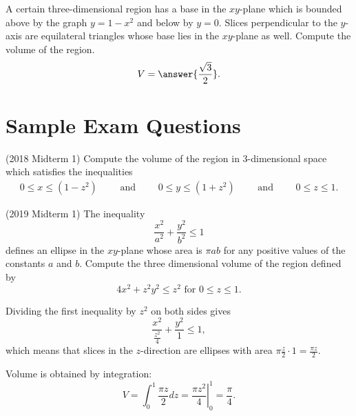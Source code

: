 \documentclass{ximera}
\begin{document}
\begin{exercise}
A certain three-dimensional region has a base in the $xy$-plane which is bounded above by the graph $y = 1-x^2$ and below by $y=0$. Slices perpendicular to the $y$-axis are equilateral triangles whose base lies in the $xy$-plane as well. Compute the volume of the region.
\[ V = \answer{\frac{\sqrt{3}}{2}}. \]
\end{exercise}

\section*{Sample Exam Questions}

\begin{question}(2018 Midterm 1)
Compute the volume of the region in 3-dimensional space which satisfies the inequalities
\begin{align*} 
0 \leq   x \leq (1 - z^2) \qquad \mbox{ and } \qquad
0 \leq  y \leq (1 + z^2) \qquad \mbox{ and } \qquad 
0 \leq z \leq 1.
\end{align*}
\vspace{-12pt}
\begin{multipleChoice}
\end{multipleChoice}
\end{question}

\begin{question}(2019 Midterm 1)
The inequality 
\[ \frac{x^2}{a^2} + \frac{y^2}{b^2} \leq 1 \]
defines an ellipse in the $xy$-plane whose area is $\pi a b$ for any positive values of the constants $a$ and $b$.  Compute the three dimensional volume of the region defined by
\[ 4 x^2 + z^2 y^2 \leq z^2 \mbox{ for } 0 \leq z \leq 1. \]
\begin{multipleChoice}
\choice{$4 \pi$}
\choice{$\displaystyle {\pi}$}
\end{multipleChoice}
\begin{feedback}
Dividing the first inequality by $z^2$ on both sides gives
\[ \frac{x^2}{\frac{z^2}{4}} + \frac{y^2}{1} \leq 1, \]
which means that slices in the $z$-direction are ellipses with area $\pi \frac{z}{2} \cdot 1 = \frac{\pi z}{2}$. 
\begin{hint}
Volume is obtained by integration:
\[ V = \int_0^1 \frac{\pi z}{2} dz = \left. \frac{\pi z^2}{4} \right|_{0}^1 = \frac{\pi}{4}. \]
\end{hint}
\end{feedback}
\end{question}
\end{document}
